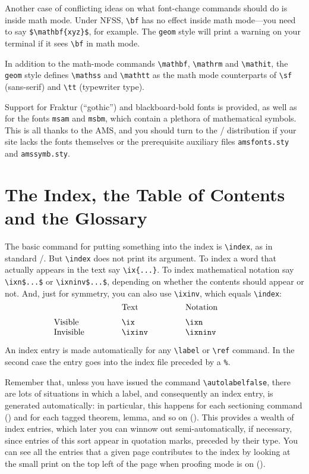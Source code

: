 Another case of conflicting ideas on what font-change commands should
do is inside math mode.  Under NFSS,
\verb+\bf+ has no effect inside math mode---you need to say
\verb+$\mathbf{xyz}$+, for example.  The \verb+geom+ style will
print a warning on your terminal if it sees \verb|\bf| in math mode.  

In addition to the math-mode commands \verb+\mathbf+, \verb+\mathrm+ and
\verb+\mathit+, the \verb+geom+ style defines \verb+\mathss+ and
\verb+\mathtt+ as the math mode counterparts of \verb+\sf+ (sans-serif)
and \verb+\tt+ (typewriter type).

Support for Fraktur (``gothic'') and blackboard-bold fonts is
provided, as well as for the fonts \verb+msam+ and \verb+msbm+, which
contain a plethora of mathematical symbols. This is all thanks to the
AMS, and you should turn to the \amslatex/ distribution
\cite{amslatex} if your site lacks the fonts themselves or the
prerequisite auxiliary files \verb+amsfonts.sty+ and
\verb+amssymb.sty+.

\section{The Index, the Table of Contents and the Glossary}

The basic command for putting something into the index is
\verb+\index+, as in standard \latex/.  But \verb+\index+ does not
print its argument.  To index a word that actually appears in the text
say \verb+\ix{...}+.  To index mathematical notation say
\verb+\ixn$...$+ or \verb+\ixninv$...$+, depending on whether the
contents should appear or not.  And, just for symmetry, you can also
use \verb+\ixinv+, which equals \verb+\index+:
$$
\vbox{\halign to .7\hsize{\tabskip=0pt plus 1fil
#\hfil &&{\tt \char`\\ #}\hfil\cr
&\omit Text&\omit Notation\cr
\noalign{\medskip}
Visible&ix&ixn\cr
Invisible&ixinv&ixninv\cr}}
$$

An index entry is made automatically for any \verb+\label+ or
\verb+\ref+ command.  In the second case the entry goes into the index
file preceded by a \verb+%+. 

Remember that, unless you have issued the
command \verb|\autolabelfalse|, there are lots of situations in which
a label, and consequently an index entry, is generated automatically:
in particular, this happens for each sectioning command
() and for each tagged
theorem, lemma, and so on ().  
This provides a
wealth of index entries, which later you can winnow out
semi-automatically, if necessary, since entries of this sort appear in
quotation marks, preceded by their type.  You can see all the entries
that a given page contributes to the index by looking at the small
print on the top left of the page when proofing mode is on 
().

